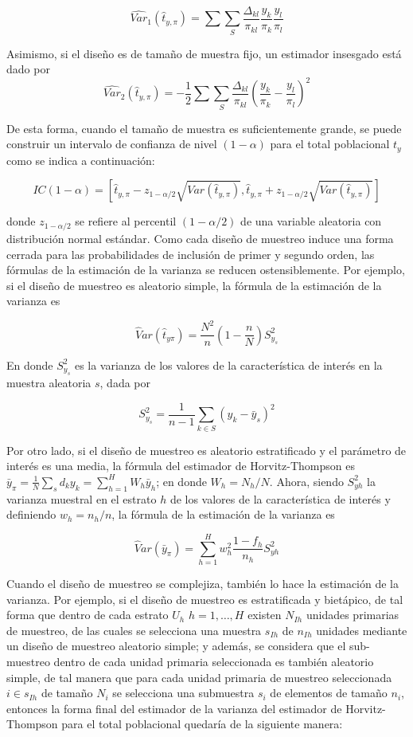\documentclass[
  12pt,
  spanish,
]{book}
\begin{document}
\[
\widehat{Var}_1(\hat{t}_{y,\pi})=\sum\sum_S \dfrac{\Delta_{kl}}{\pi_{kl}}\frac{y_k}{\pi_k}\frac{y_l}{\pi_l}
\]

Asimismo, si el diseño es de tamaño de muestra fijo, un estimador insesgado está dado por
\[
\widehat{Var}_2(\hat{t}_{y,\pi})=-\frac{1}{2}\sum\sum_S\frac{\Delta_{kl}}{\pi_{kl}}\left(\frac{y_k}{\pi_k}-\frac{y_l}{\pi_l}\right)^2
\]

De esta forma, cuando el tamaño de muestra es suficientemente grande, se puede construir un intervalo de confianza de nivel \((1-\alpha)\) para el total poblacional \(t_y\) como se indica a continuación:

\[
IC(1-\alpha)=\left[\hat{t}_{y,\pi}-z_{1-\alpha / 2}\sqrt{ Var(\hat{t}_{y,\pi})},\hat{t}_{y,\pi}+z_{1-\alpha / 2}\sqrt{Var(\hat{t}_{y,\pi})}\right]
\]

donde \(z_{1-\alpha / 2}\) se refiere al percentil \((1-\alpha / 2)\) de una variable aleatoria con distribución normal estándar. Como cada diseño de muestreo induce una forma cerrada para las probabilidades de inclusión de primer y segundo orden, las fórmulas de la estimación de la varianza se reducen ostensiblemente. Por ejemplo, si el diseño de muestreo es aleatorio simple, la fórmula de la estimación de la varianza es

\[
\widehat Var(\hat{t}_{y\pi}) = \frac{N^2}{n} \left( 1- \frac{n}{N} \right) S^2_{y_s}
\]

En donde \(S^2_{y_s}\) es la varianza de los valores de la característica de interés en la muestra aleatoria \(s\), dada por

\[
S^2_{y_s}=\frac{1}{n-1}\sum_{k\in S}(y_k-\bar{y}_s)^2
\]

Por otro lado, si el diseño de muestreo es aleatorio estratificado y el parámetro de interés es una media, la fórmula del estimador de Horvitz-Thompson es \(\bar{y}_{\pi} = \frac{1}{N}\sum_s d_k y_k = \sum_{h=1}^H W_h \bar{y}_h\); en donde \(W_h = N_h/N\). Ahora, siendo \(S^2_{yh}\) la varianza muestral en el estrato \(h\) de los valores de la característica de interés y definiendo \(w_h = n_h/n\), la fórmula de la estimación de la varianza es

\[
\widehat Var(\bar{y}_{\pi}) = \sum_{h=1}^H w_h^2 \frac{1-f_h}{n_h}S^2_{yh}
 \]

Cuando el diseño de muestreo se complejiza, también lo hace la estimación de la varianza. Por ejemplo, si el diseño de muestreo es estratificada y bietápico, de tal forma que dentro de cada estrato \(U_h\) \(h=1,\ldots, H\) existen \(N_{Ih}\) unidades primarias de muestreo, de las cuales se selecciona una muestra \(s_{Ih}\) de \(n_{Ih}\) unidades mediante un diseño de muestreo aleatorio simple; y además, se considera que el sub-muestreo dentro de cada unidad primaria seleccionada es también aleatorio simple, de tal manera que para cada unidad primaria de muestreo seleccionada \(i\in s_{Ih}\) de tamaño \(N_i\) se selecciona una submuestra \(s_i\) de elementos de tamaño \(n_i\), entonces la forma final del estimador de la varianza del estimador de Horvitz-Thompson para el total poblacional quedaría de la siguiente manera:
\end{document}

